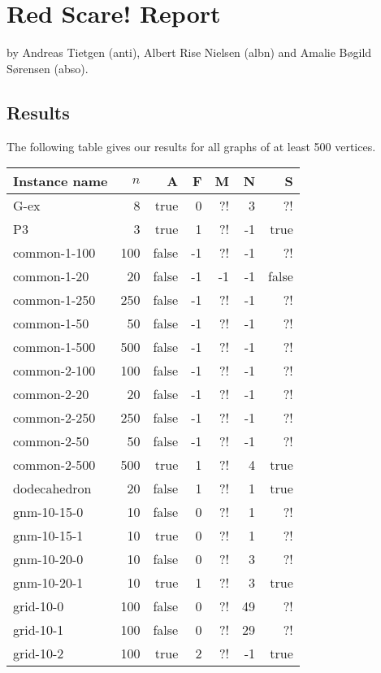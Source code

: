 \documentclass[a4paper]{article}
\begin{document}
\section{Red Scare! Report}

by Andreas Tietgen (anti), Albert Rise Nielsen (albn) and Amalie Bøgild Sørensen (abso).

\subsection{Results}

The following table gives our results for all graphs of at least 500 vertices.

\medskip
\begin{longtable}{lrrrrrr}
\toprule
	Instance name & $n$ & A & F & M & N & S\\
	\midrule
	G-ex & 8 & true & 0 & ?! & 3 & ?!\\
	P3 & 3 & true & 1 & ?! & -1 & true\\
	common-1-100 & 100 & false & -1 & ?! & -1 & ?!\\
	common-1-20 & 20 & false & -1 & -1 & -1 & false\\
	common-1-250 & 250 & false & -1 & ?! & -1 & ?!\\
	common-1-50 & 50 & false & -1 & ?! & -1 & ?!\\
	common-1-500 & 500 & false & -1 & ?! & -1 & ?!\\
	common-2-100 & 100 & false & -1 & ?! & -1 & ?!\\
	common-2-20 & 20 & false & -1 & ?! & -1 & ?!\\
	common-2-250 & 250 & false & -1 & ?! & -1 & ?!\\
	common-2-50 & 50 & false & -1 & ?! & -1 & ?!\\
	common-2-500 & 500 & true & 1 & ?! & 4 & true\\
	dodecahedron & 20 & false & 1 & ?! & 1 & true\\
	gnm-10-15-0 & 10 & false & 0 & ?! & 1 & ?!\\
	gnm-10-15-1 & 10 & true & 0 & ?! & 1 & ?!\\
	gnm-10-20-0 & 10 & false & 0 & ?! & 3 & ?!\\
	gnm-10-20-1 & 10 & true & 1 & ?! & 3 & true\\
	grid-10-0 & 100 & false & 0 & ?! & 49 & ?!\\
	grid-10-1 & 100 & false & 0 & ?! & 29 & ?!\\
	grid-10-2 & 100 & true & 2 & ?! & -1 & true\\

\end{longtable}
\end{document}
